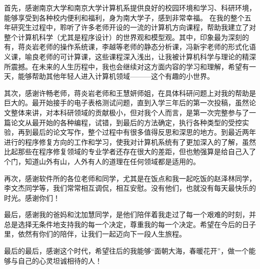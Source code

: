 \begin{acknowledgement}

首先，感谢南京大学和南京大学计算机系提供良好的校园环境和学习、科研环境，能够享受到各种校内便利和福利，身为南大学子，感到非常幸福。
在我的整个五年研究生过程中，聆听了许多老师开设的一流的计算机方向课程，帮助我建立了对整个计算机科学（尤其是程序设计）的世界观和模型观。其中，印象最为深刻的有，蒋炎岩老师的操作系统课，李越等老师的静态分析课，冯新宇老师的形式化语义课，喻良老师的可计算课，这些课程深入浅出，让我被计算机科学与理论的精深所震撼。在未来的人生历程中，我也会继续对这方面内容的学习和理解，希望有一天，能够帮助其他年轻人进入计算机领域———这个有趣的小世界。

其次，感谢许畅老师，蒋炎岩老师和王慧妍师姐，在具体科研问题上对我的帮助是巨大的。最开始接手的电子表格测试问题，直到入学三年后的第一次投稿，虽然论文整体来讲，对本科研领域的贡献极小，但对我个人而言，是第一次完整参与了一篇论文从最开始的各种编程，试错，到最后的方法确定，执行各种类型的受控实验，再到最后的论文写作，整个过程中有很多值得反思和深思的地方。到最近两年进行的程序修复方向的工作和学习，使我对计算机系统有了更加深入的了解，虽然比起那些在程序修复领域的专业学者还存在很大的差距，但也勉强算是给自己入了个门，知道山外有山，人外有人的道理在任何领域都是适用的。

再次，感谢软件所的各位老师和同学，尤其是在饭点和我一起吃饭的赵泽林同学，李文杰同学等，我们常常相互调侃，相互安慰。没有他们，也就没有每天最快乐的时光。感谢你们！

最后，感谢我的爸妈和沈加慧同学，是他们陪伴着我走过了每一个艰难的时刻，并总是选择无条件地支持我的每一个决定，尊重我的每一个决定。希望在今后的日子里，依然有你们的陪伴，让我们一起迈向下一段人生旅程。

最后的最后，感谢这个时代，希望往后的我能够“面朝大海，春暖花开”，做一个能够与自己的心灵坦诚相待的人！

\end{acknowledgement}